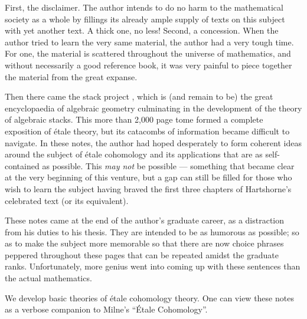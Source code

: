 \Preface

First, the disclaimer. The author intends to do no harm to the
mathematical society as a whole by fillings its already ample
supply of texts on this subject with yet another text. A thick
one, no less! Second, a concession. When the author tried to
learn the very same material, the author had a very tough time.
For one, the material is scattered throughout the universe of
mathematics, and without necessarily a good reference book, it
was very painful to piece together the material from the great
expanse.

Then there came the stack project \cite{Stack}, which is (and 
remain to be) the great encyclopaedia of algebraic geometry 
culminating in the development of the theory of algebraic stacks. 
This more than 2,000 page tome formed a complete exposition of 
\'etale theory, but its catacombs of information became difficult 
to navigate. In these notes, the author had hoped desperately to 
form coherent ideas around the subject of \'etale cohomology and 
its applications that are as self-contained as possible. This 
\emph{may not} be possible --- something that became clear at the 
very beginning of this venture, but a gap can still be filled for 
those who wish to learn the subject having braved the first three 
chapters of Hartshorne's celebrated text (or its equivalent).

These notes came at the end of the author's graduate career,
as a distraction from his duties to his thesis. They are intended
to be as humorous as possible; so as to make the subject more
memorable so that there are now choice phrases peppered throughout 
these pages that can be repeated amidst the graduate ranks. 
Unfortunately, more genius went into coming up with these sentences
than the actual mathematics. 

We develop basic theories of \'etale cohomology theory. One can
view these notes as a verbose companion to Milne's ``\'Etale
Cohomology''.
